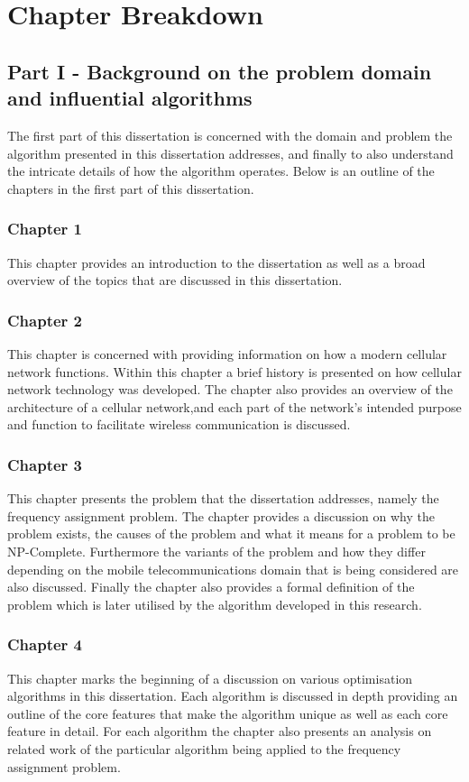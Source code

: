 \section {Chapter Breakdown}
\subsection{Part I - Background on the problem domain and influential algorithms}
The first part of this dissertation is concerned with the domain and problem the algorithm presented in this dissertation addresses, and finally to also understand the intricate details of how the algorithm operates.
Below is an outline of the chapters in the first part of this dissertation.
\subsubsection{Chapter 1}
This chapter provides an introduction to the dissertation as well as a broad overview of the topics that are discussed in this dissertation.
\subsubsection{Chapter 2}
This chapter is concerned with providing information on how a modern cellular network functions. Within this chapter a brief history is presented on how cellular network technology was developed. The chapter also provides an overview of the architecture of a cellular network,and each part of the network's intended purpose and function to facilitate wireless communication is discussed.
\subsubsection{Chapter 3}
This chapter presents the problem that the dissertation addresses, namely the frequency assignment problem. The chapter provides a discussion on why the problem exists, the causes of the problem and what it means for a problem to be NP-Complete. Furthermore the variants of the problem and how they differ depending on the mobile telecommunications domain that is being considered are also discussed. Finally the chapter also provides a formal definition of the problem which is later utilised by the algorithm developed in this research.
\subsubsection{Chapter 4}
This chapter marks the beginning of a discussion on various optimisation algorithms in this dissertation. Each algorithm is discussed in depth providing an outline of the core features that make the algorithm unique as well as each core feature in detail. For each algorithm the chapter also presents an analysis on related work of the particular algorithm being applied to the frequency assignment problem. 
